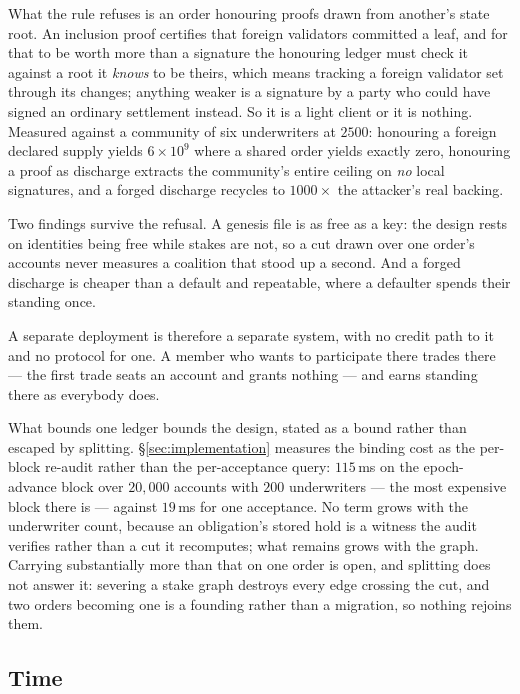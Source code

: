 What the rule refuses is an order honouring proofs drawn from another's state root. An
inclusion proof certifies that foreign validators committed a leaf, and for that to be
worth more than a signature the honouring ledger must check it against a root it
\emph{knows} to be theirs, which means tracking a foreign validator set through its
changes; anything weaker is a signature by a party who could have signed an ordinary
settlement instead. So it is a light client or it is nothing. Measured against a community
of six underwriters at $2500$: honouring a foreign declared supply yields $6\times10^{9}$
where a shared order yields exactly zero, honouring a proof as discharge extracts the
community's entire ceiling on \emph{no} local signatures, and a forged discharge recycles
to $1000\times$ the attacker's real backing.

Two findings survive the refusal. A genesis file is as free as a key: the design rests on
identities being free while stakes are not, so a cut drawn over one order's accounts never
measures a coalition that stood up a second. And a forged discharge is cheaper than a
default and repeatable, where a defaulter spends their standing once.

A separate deployment is therefore a separate system, with no credit path to it and no
protocol for one. A member who wants to participate there trades there --- the first trade
seats an account and grants nothing --- and earns standing there as everybody does.

What bounds one ledger bounds the design, stated as a bound rather than escaped by
splitting. \S\ref{sec:implementation} measures the binding cost as the per-block re-audit
rather than the per-acceptance query: $115$\,ms on the epoch-advance block over
$20{,}000$ accounts with $200$ underwriters --- the most expensive block there is ---
against $19$\,ms for one acceptance. No term grows with the underwriter count, because an
obligation's stored hold is a witness the audit verifies rather than a cut it recomputes;
what remains grows with the graph. Carrying substantially more than that on one order is
open, and splitting does not answer it: severing a stake graph destroys every edge
crossing the cut, and two orders becoming one is a founding rather than a migration, so
nothing rejoins them.

\subsection{Time}

